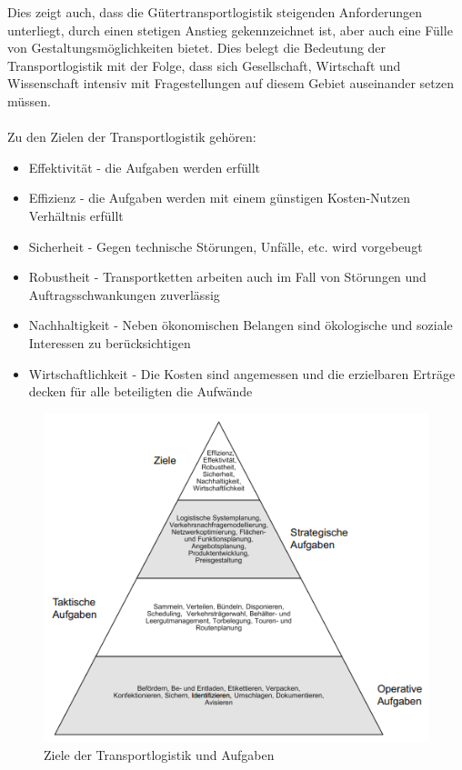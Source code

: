 \documentclass[a4paper,12pt]{scrreprt}
\begin{document}
	Dies zeigt auch, dass die Gütertransportlogistik steigenden
	Anforderungen unterliegt, durch einen stetigen Anstieg gekennzeichnet ist, aber auch eine Fülle von Gestaltungsmöglichkeiten bietet. Dies belegt die Bedeutung der Transportlogistik mit der Folge, dass sich Gesellschaft, Wirtschaft und Wissenschaft intensiv mit Fragestellungen auf diesem Gebiet auseinander setzen müssen.\\\\
	Zu den Zielen der Transportlogistik gehören:
	\begin{itemize}
	\item Effektivität - die Aufgaben werden erfüllt
	\item Effizienz - die Aufgaben werden mit einem günstigen Kosten-Nutzen Verhältnis erfüllt
	\item Sicherheit - Gegen technische Störungen, Unfälle, etc. wird vorgebeugt
	\item Robustheit - Transportketten arbeiten auch im Fall von Störungen und Auftragsschwankungen zuverlässig
	\item Nachhaltigkeit - Neben ökonomischen Belangen sind ökologische und soziale Interessen zu berücksichtigen
	\item Wirtschaftlichkeit - Die Kosten sind angemessen und die erzielbaren Erträge decken für alle beteiligten die Aufwände
	\end{itemize}
	
	\begin{figure}
\centering
\includegraphics[width=1\linewidth]{./Ziele_Transportlogistik}
\caption{Ziele der Transportlogistik und Aufgaben}
\label{fig:Ziele_Transportlogistik}
\end{figure}
\end{document}
